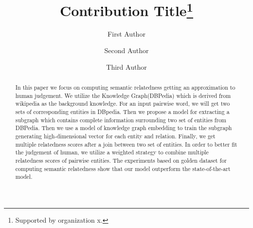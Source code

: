 \documentclass[runningheads]{llncs}
\begin{document}
  \title{Contribution Title\thanks{Supported by organization x.}}
  \author{First Author \and
  Second Author \and
  Third Author}
  \maketitle              %
  \begin{abstract}
    In this paper we focus on computing semantic relatedness getting an approximation to human judgement.
    We utilize the Knowledge Graph(DBPedia) which is derived from wikipedia as the background knowledge.
    For an input pairwise word, we will get two sets of corresponding entities in DBpedia.
    Then we propose a model for extracting a subgraph which contains complete information surrounding two set of entities from DBPedia.
    Then we use a model of knowledge graph embedding to train the subgraph generating high-dimensional vector for each entity and relation. 
    Finally, we get multiple relatedness scores after a join between two set of entities.
    In order to better fit the judgement of human, we utilize a weighted strategy to combine
    multiple relatedness scores of pairwise entities.
    The experiments based on golden dataset for computing semantic relatedness show
    that our model outperform the state-of-the-art model.
  
  \end{abstract}
  
  
  
  
  

  
  
  
\end{document}
